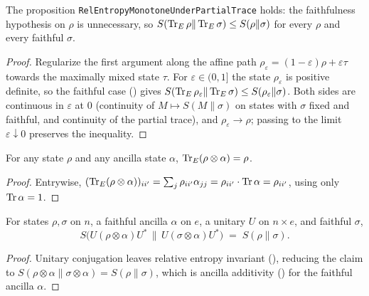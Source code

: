 \begin{theorem}\label{relEntropyMonotone_partialTrace}
  \leanok
  The proposition \texttt{RelEntropyMonotoneUnderPartialTrace} holds: the faithfulness hypothesis
  on \(\rho\) is unnecessary, so \(S(\operatorname{Tr}_E\rho\|\operatorname{Tr}_E\sigma)\le S(\rho\|\sigma)\) for every
  \(\rho\) and every faithful \(\sigma\).
\end{theorem}
\begin{proof}\leanok
  Regularize the first argument along the affine path
  \(\rho_\varepsilon = (1-\varepsilon)\rho + \varepsilon\tau\) towards the maximally mixed state
  \(\tau\). For \(\varepsilon\in(0,1]\) the state \(\rho_\varepsilon\) is positive definite, so the
  faithful case () gives
  \(S(\operatorname{Tr}_E\rho_\varepsilon\|\operatorname{Tr}_E\sigma)\le S(\rho_\varepsilon\|\sigma)\). Both sides are
  continuous in \(\varepsilon\) at \(0\) (continuity of \(M\mapsto S(M\|\sigma)\) on states with
  \(\sigma\) fixed and faithful, and continuity of the partial trace), and
  \(\rho_\varepsilon\to\rho\); passing to the limit \(\varepsilon\downarrow 0\) preserves the
  inequality.
\end{proof}

\begin{lemma}\label{partialTraceRight_kron}
  \leanok
  For any state \(\rho\) and any ancilla state \(\alpha\), \(\operatorname{Tr}_E(\rho\otimes\alpha) = \rho\).
\end{lemma}
\begin{proof}\leanok
  Entrywise, \((\operatorname{Tr}_E(\rho\otimes\alpha))_{ii'} = \sum_j\rho_{ii'}\alpha_{jj}
  = \rho_{ii'}\cdot\operatorname{Tr}\alpha = \rho_{ii'}\), using only \(\operatorname{Tr}\alpha = 1\).
\end{proof}

\begin{theorem}\label{relEntropy_embed_invariant}
  \leanok
  For states \(\rho,\sigma\) on \(n\), a faithful ancilla \(\alpha\) on \(e\), a unitary \(U\) on
  \(n\times e\), and faithful \(\sigma\),
  \[
    S\bigl(U(\rho\otimes\alpha)U^{*}\,\big\|\,U(\sigma\otimes\alpha)U^{*}\bigr) \;=\; S(\rho\|\sigma).
  \]
\end{theorem}
\begin{proof}\leanok
  Unitary conjugation leaves relative entropy invariant (),
  reducing the claim to \(S(\rho\otimes\alpha\|\sigma\otimes\alpha) = S(\rho\|\sigma)\), which is
  ancilla additivity () for the faithful ancilla \(\alpha\).
\end{proof}

